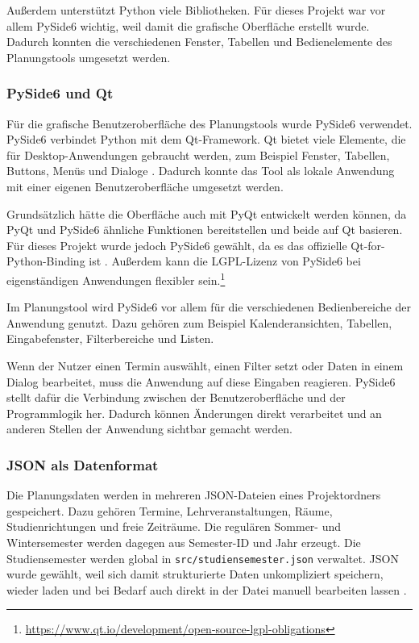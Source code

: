 \documentclass[12pt,a4paper]{article}
\begin{document}
Außerdem unterstützt Python viele Bibliotheken. Für dieses Projekt war vor allem PySide6 wichtig, weil damit die grafische Oberfläche erstellt wurde. Dadurch konnten die verschiedenen Fenster, Tabellen und Bedienelemente des Planungstools umgesetzt werden.

\subsubsection{PySide6 und Qt}

Für die grafische Benutzeroberfläche des Planungstools wurde PySide6 verwendet. PySide6 verbindet Python mit dem Qt-Framework. Qt bietet viele Elemente, die für Desktop-Anwendungen gebraucht werden, zum Beispiel Fenster, Tabellen, Buttons, Menüs und Dialoge \cite{qtDocs}. Dadurch konnte das Tool als lokale Anwendung mit einer eigenen Benutzeroberfläche umgesetzt werden.

Grundsätzlich hätte die Oberfläche auch mit PyQt entwickelt werden können, da PyQt und PySide6 ähnliche Funktionen bereitstellen und beide auf Qt basieren. Für dieses Projekt wurde jedoch PySide6 gewählt, da es das offizielle Qt-for-Python-Binding ist \cite{qtForPython}. Außerdem kann die LGPL-Lizenz von PySide6 bei eigenständigen Anwendungen flexibler sein.\footnote{\url{https://www.qt.io/development/open-source-lgpl-obligations}}

Im Planungstool wird PySide6 vor allem für die verschiedenen Bedienbereiche der Anwendung genutzt. Dazu gehören zum Beispiel Kalenderansichten, Tabellen, Eingabefenster, Filterbereiche und Listen.

Wenn der Nutzer einen Termin auswählt, einen Filter setzt oder Daten in einem Dialog bearbeitet, muss die Anwendung auf diese Eingaben reagieren. PySide6 stellt dafür die Verbindung zwischen der Benutzeroberfläche und der Programmlogik her. Dadurch können Änderungen direkt verarbeitet und an anderen Stellen der Anwendung sichtbar gemacht werden.

\subsubsection{JSON als Datenformat}

Die Planungsdaten werden in mehreren JSON-Dateien eines Projektordners gespeichert. Dazu gehören Termine, Lehrveranstaltungen, Räume, Studienrichtungen und freie Zeiträume. Die regulären Sommer- und Wintersemester werden dagegen aus Semester-ID und Jahr erzeugt. Die Studiensemester werden global in \texttt{src/studiensemester.json} verwaltet. JSON wurde gewählt, weil sich damit strukturierte Daten unkompliziert speichern, wieder laden und bei Bedarf auch direkt in der Datei manuell bearbeiten lassen \cite{bray2017json}.
\end{document}
